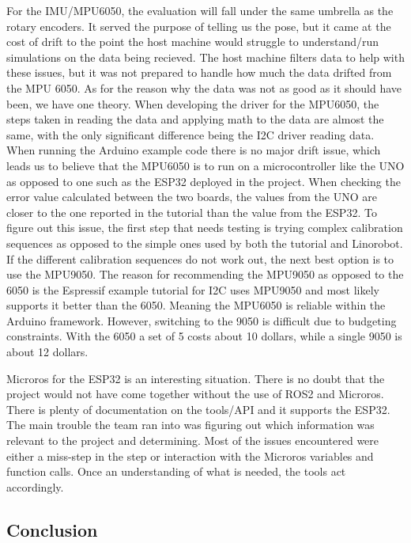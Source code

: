 \documentclass[conference]{IEEEtran}
\begin{document}
For the IMU/MPU6050, the evaluation will fall under the same umbrella as the rotary encoders. It served the purpose of telling us the pose, but it came at the cost of drift to the point the host machine would struggle to understand/run simulations on the data being recieved. The host machine filters data to help with these issues, but it was not prepared to handle how much the data drifted from the MPU 6050. As for the reason why the data was not as good as it should have been, we have one theory. When developing the driver for the MPU6050, the steps taken in reading the data and applying math to the data are almost the same, with the only significant difference being the I2C driver reading data. When running the Arduino example code there is no major drift issue, which leads us to believe that the MPU6050 is to run on a microcontroller like the UNO as opposed to one such as the ESP32 deployed in the project. When checking the error value calculated between the two boards, the values from the UNO are closer to the one reported in the tutorial than the value from the ESP32. To figure out this issue, the first step that needs testing is trying complex calibration sequences as opposed to the simple ones used by both the tutorial and Linorobot. If the different calibration sequences do not work out, the next best option is to use the MPU9050. The reason for recommending the MPU9050 as opposed to the 6050 is the Espressif example tutorial for I2C uses MPU9050 and most likely supports it better than the 6050. Meaning the MPU6050 is reliable within the Arduino framework. However, switching to the 9050 is difficult due to budgeting constraints. With the 6050 a set of 5 costs about 10 dollars, while a single 9050 is about 12 dollars.

Microros for the ESP32 is an interesting situation. There is no doubt that the project would not have come together without the use of ROS2 and Microros. There is plenty of documentation on the tools/API and it supports the ESP32. The main trouble the team ran into was figuring out which information was relevant to the project and determining. Most of the issues encountered were either a miss-step in the step or interaction with the Microros variables and function calls. Once an understanding of what is needed, the tools act accordingly.

\subsection{Conclusion}
\end{document}
